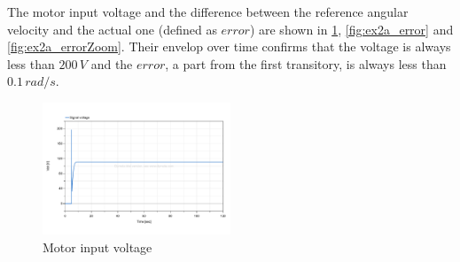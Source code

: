 \documentclass[11pt,a4paper,oneside]{article}
\begin{document}
The motor input voltage and the difference between the reference angular velocity and the actual one (defined as $error$) are shown in \cref{fig:ex2a_voltage}, \cref{fig:ex2a_error} and \cref{fig:ex2a_errorZoom}.
Their envelop over time confirms that the voltage is always less than $200\,V$ and the $error$, a part from the first transitory, is always less than $0.1\,rad/s$.
\begin{figure}[H]
    \centering
    \includegraphics*[width=0.5\textwidth, keepaspectratio]{Figures/ex2a_voltage.pdf}
    \caption[]{\label{fig:ex2a_voltage} Motor input voltage}
\end{figure}
\end{document}
